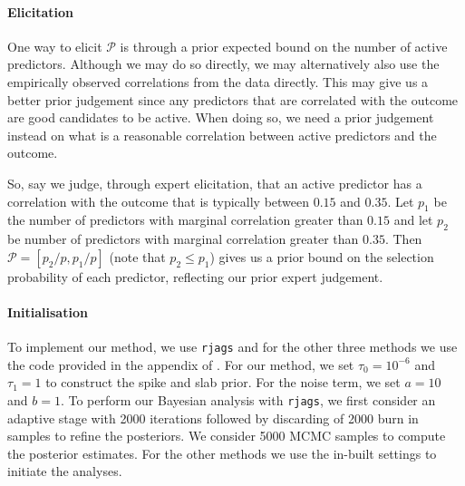 \documentclass[preprint,12pt]{elsarticle}
\begin{document}
\paragraph{Elicitation}
One way to elicit $\mathcal{P}$
is through a prior expected bound on the number of active predictors.
Although we may do so directly,
we may alternatively also use the empirically observed correlations from the data directly.
This may give us a better prior judgement since any predictors that are correlated with the outcome are good candidates to be active.
When doing so, we need a prior judgement instead on what is a reasonable correlation between active predictors and the outcome.

So, say we judge, through expert elicitation, that
an active predictor has a correlation with the outcome
that is typically between $0.15$ and $0.35$.
Let $p_1$ be the number of predictors with marginal correlation greater than $0.15$
and let $p_2$ be number of predictors with marginal 
correlation greater than $0.35$.
Then $\mathcal{P}=[p_2/p , p_1/p]$ (note that $p_2\le p_1$) gives us a prior bound on the selection probability of each predictor, reflecting our prior expert judgement.

\paragraph{Initialisation} 
To implement our method, we use \texttt{rjags} and for the other three
methods we use the code provided in the appendix of \citep{koch2020}.
For our method, we set $\tau_0=10^{-6}$ and $\tau_1=1$ to construct the
spike and slab prior.
For the noise term, we set $a=10$ and $b=1$.
To perform 
our Bayesian analysis with \texttt{rjags}, we first consider an adaptive 
stage with 2000 iterations followed by discarding of 2000 burn in samples 
to refine the posteriors. We consider 5000 MCMC samples to compute the
posterior estimates. For the other methods we use the in-built settings 
to initiate the analyses.
\end{document}
